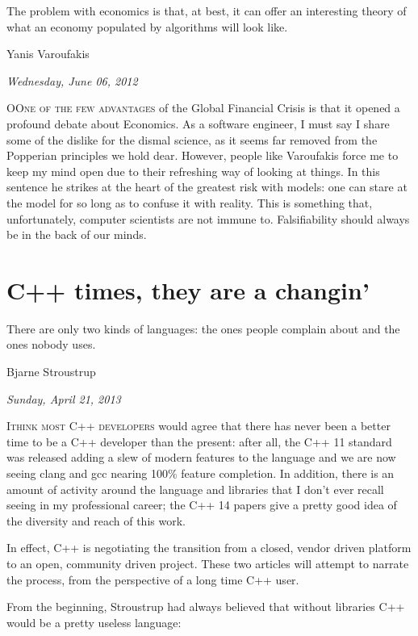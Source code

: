 \documentclass{book}
\begin{document}
\epigraph{The problem with economics is that, at best, it can offer an
  interesting theory of what an economy populated by algorithms will
  look like.} {Yanis Varoufakis}

\begin{flushright}
  \emph{Wednesday, June 06, 2012}
\end{flushright}

\lettrine{O}{One of the few advantages} of the Global Financial Crisis
is that it opened a profound debate about Economics. As a software
engineer, I must say I share some of the dislike for the dismal
science, as it seems far removed from the Popperian principles we hold
dear. However, people like Varoufakis force me to keep my mind open
due to their refreshing way of looking at things. In this sentence he
strikes at the heart of the greatest risk with models: one can stare
at the model for so long as to confuse it with reality. This is
something that, unfortunately, computer scientists are not immune
to. Falsifiability should always be in the back of our minds.

\chapter{C++ times, they are a changin'}

\epigraph{There are only two kinds of languages: the ones people complain
  about and the ones nobody uses.} {Bjarne Stroustrup}

\begin{flushright}
  \emph{Sunday, April 21, 2013}
\end{flushright}

\lettrine{I} {think most C++ developers} would agree that there has
never been a better time to be a C++ developer than the present: after
all, the C++ 11 standard was released adding a slew of modern features
to the language and we are now seeing clang and gcc nearing 100\%
feature completion. In addition, there is an amount of activity around
the language and libraries that I don't ever recall seeing in my
professional career; the C++ 14 papers give a pretty good idea of the
diversity and reach of this work.

In effect, C++ is negotiating the transition from a closed, vendor
driven platform to an open, community driven project. These two
articles will attempt to narrate the process, from the perspective of
a long time C++ user.

From the beginning, Stroustrup had always believed that without
libraries C++ would be a pretty useless language:
\end{document}
